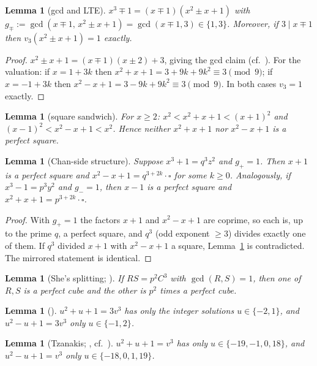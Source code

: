 \documentclass[11pt]{article}
\newtheorem{lemma}[theorem]{Lemma}
\theoremstyle{remark}
\newcommand{\vp}{v}
\begin{document}
\begin{lemma}[gcd and LTE]\label{lem:gcd}
$x^3\mp1=(x\mp1)(x^2\pm x+1)$ with $g_\mp:=\gcd(x\mp 1,\,x^2\pm x+1)=\gcd(x\mp1,3)\in\{1,3\}$. Moreover, if $3\mid x\mp 1$ then $\vp_3(x^2\pm x+1)=1$ exactly.
\end{lemma}
\begin{proof}
$x^2\pm x+1=(x\mp1)(x\pm2)+3$, giving the gcd claim (cf.\ \cite[Lemma~4]{She2025}). For the valuation: if $x=1+3k$ then $x^2+x+1=3+9k+9k^2\equiv3\pmod9$; if $x=-1+3k$ then $x^2-x+1=3-9k+9k^2\equiv3\pmod9$. In both cases $\vp_3=1$ exactly.
\end{proof}

\begin{lemma}[square sandwich]\label{lem:sandwich}
For $x\ge2$: $x^2<x^2+x+1<(x+1)^2$ and $(x-1)^2<x^2-x+1<x^2$. Hence neither $x^2+x+1$ nor $x^2-x+1$ is a perfect square.
\end{lemma}

\begin{lemma}[Chan-side structure]\label{lem:chanside}
Suppose $x^3+1=q^3z^2$ and $g_+=1$. Then $x+1$ is a perfect square and $x^2-x+1=q^{3+2k}\cdot\square$ for some $k\ge0$. Analogously, if $x^3-1=p^3y^2$ and $g_-=1$, then $x-1$ is a perfect square and $x^2+x+1=p^{3+2k}\cdot\square$.
\end{lemma}
\begin{proof}
With $g_+=1$ the factors $x+1$ and $x^2-x+1$ are coprime, so each is, up to the prime $q$, a perfect square, and $q^3$ (odd exponent $\ge3$) divides exactly one of them. If $q^3$ divided $x+1$ with $x^2-x+1$ a square, Lemma~\ref{lem:sandwich} is contradicted. The mirrored statement is identical.
\end{proof}

\begin{lemma}[She's splitting; {\cite[Lemma~1]{She2025}}]\label{lem:she1}
If $RS=p^2C^3$ with $\gcd(R,S)=1$, then one of $R,S$ is a perfect cube and the other is $p^2$ times a perfect cube.
\end{lemma}

\begin{lemma}[{\cite[Lemma~2]{She2025}}]\label{lem:she2}
$u^2+u+1=3v^3$ has only the integer solutions $u\in\{-2,1\}$, and $u^2-u+1=3v^3$ only $u\in\{-1,2\}$.
\end{lemma}

\begin{lemma}[Tzanakis; {\cite{Tzanakis}, cf.\ \cite[Lemma~3]{She2025}}]\label{lem:she3}
$u^2+u+1=v^3$ has only $u\in\{-19,-1,0,18\}$, and $u^2-u+1=v^3$ only $u\in\{-18,0,1,19\}$.
\end{lemma}
\end{document}
